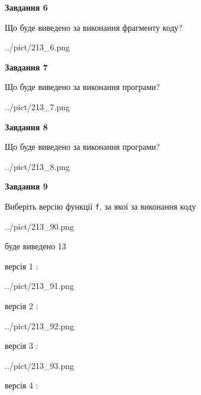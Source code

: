 \documentclass[12pt, ukrainian]{article}
\def\code#1{\Verb!#1!}
\begin{document}
{\begin {large}
{\begin {center}\textbf{Завдання 6}\end {center}}

Що буде виведено за виконання фрагменту коду?\par
\begin{center}
	{../pict/213_6.png}
\end{center}
\newpage

{\begin {center}\textbf{Завдання 7}\end {center}}

Що буде виведено за виконання програми?\par
\begin{center}
	{../pict/213_7.png}
\end{center}
\newpage

{\begin {center}\textbf{Завдання 8}\end {center}}

Що буде виведено за виконання програми?\par
\begin{center}
	{../pict/213_8.png}
\end{center}
\newpage

{\begin {center}\textbf{Завдання 9}\end {center}}

Виберіть версію функції \code{f}, за якої за виконання коду
\begin{center}
	{../pict/213_90.png}
\end{center}
буде виведено 13

\vspace{5mm}
версія 1 :

\begin{center}
	{../pict/213_91.png}
\end{center}
версія 2 :

\begin{center}
	{../pict/213_92.png}
\end{center}
версія 3 :

\begin{center}
	{../pict/213_93.png}
\end{center}
версія 4 :


\end{large}}
\end{document}
